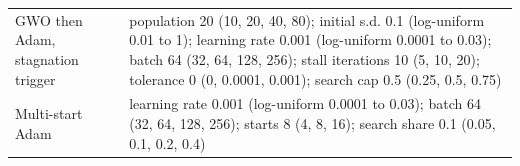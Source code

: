 \begin{tabular}{>{\raggedright\arraybackslash}p{}>{\raggedright\arraybackslash}p{}}
GWO then Adam, stagnation trigger & population 20 (10, 20, 40, 80); initial s.d. 0.1 (log-uniform 0.01 to 1); learning rate 0.001 (log-uniform 0.0001 to 0.03); batch 64 (32, 64, 128, 256); stall iterations 10 (5, 10, 20); tolerance 0 (0, 0.0001, 0.001); search cap 0.5 (0.25, 0.5, 0.75) \\
Multi-start Adam & learning rate 0.001 (log-uniform 0.0001 to 0.03); batch 64 (32, 64, 128, 256); starts 8 (4, 8, 16); search share 0.1 (0.05, 0.1, 0.2, 0.4) \\
\bottomrule
\end{tabular}
